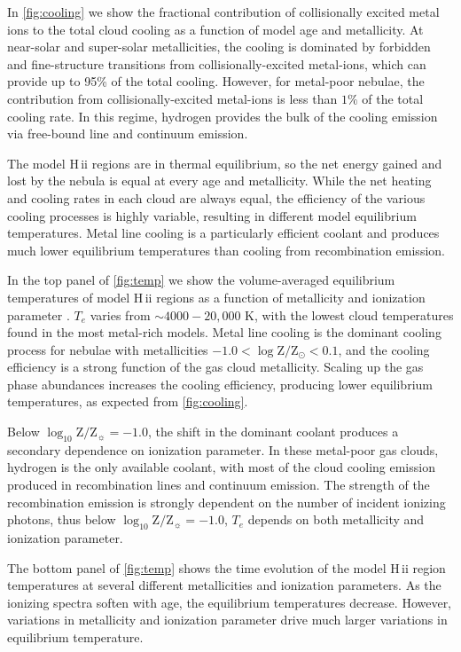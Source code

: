 \documentclass[linenumbers, tighten, trackchanges]{aastex61}%
\newcommand{\Fig}[1]{\autoref{fig:#1}}
\newcommand{\logten}{\ensuremath{\log_{10}}}
\newcommand{\Te}{\ensuremath{T_{e}}}
\newcommand{\hii}{H\,{\sc ii}\xspace}
\newcommand{\logZeq}[1]{\ensuremath{\logten \mathrm{Z}/\mathrm{Z}_{\sun} = #1}}
\begin{document}
In \Fig{cooling} we show the fractional contribution of collisionally excited metal ions to the total cloud cooling as a function of model age and metallicity. At near-solar and super-solar metallicities, the cooling is dominated by forbidden and fine-structure transitions from collisionally-excited metal-ions, which can provide up to 95\% of the total cooling. However, for metal-poor nebulae, the contribution from collisionally-excited metal-ions is less than $1\%$ of the total cooling rate. In this regime, hydrogen provides the bulk of the cooling emission via free-bound line and continuum emission.

The model \hii regions are in thermal equilibrium, so the net energy gained and lost by the nebula is equal at every age and metallicity. While the net heating and cooling rates in each cloud are always equal, the efficiency of the various cooling processes is highly variable, resulting in different model equilibrium temperatures. Metal line cooling is a particularly efficient coolant and produces much lower equilibrium temperatures than cooling from recombination emission.

In the top panel of \Fig{temp} we show the volume-averaged equilibrium temperatures of model \hii regions as a function of metallicity and ionization parameter . \Te{} varies from $\sim 4000-20,000$ K, with the lowest cloud temperatures found in the most metal-rich models. Metal line cooling is the dominant cooling process for nebulae with metallicities $-1.0 < \log \mathrm{Z}/\mathrm{Z}_{\odot} < 0.1$, and the cooling efficiency is a strong function of the gas cloud metallicity. Scaling up the gas phase abundances increases the cooling efficiency, producing lower equilibrium temperatures, as expected from \Fig{cooling}.

Below \logZeq{-1.0}, the shift in the dominant coolant produces a secondary dependence on ionization parameter. In these  metal-poor gas clouds, hydrogen is the only available coolant, with most of the cloud cooling emission produced in recombination lines and continuum emission. The strength of the recombination emission is strongly dependent on the number of incident ionizing photons, thus below \logZeq{-1.0}, \Te{} depends on both metallicity and ionization parameter.

The bottom panel of \Fig{temp} shows the time evolution of the model \hii region temperatures at several different metallicities and ionization parameters. As the ionizing spectra soften with age, the equilibrium temperatures decrease. However, variations in metallicity and ionization parameter drive much larger variations in equilibrium temperature.
\end{document}
